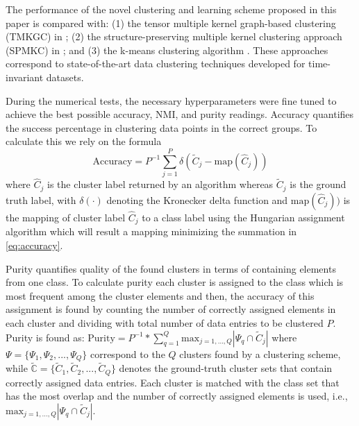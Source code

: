 \documentclass[10pt,final]{IEEEtran}
\begin{document}
The performance of the novel clustering and learning scheme proposed in this paper is compared with: (1) the tensor multiple kernel graph-based clustering (TMKGC) in \cite{tkmgc}; (2) the structure-preserving multiple kernel clustering approach (SPMKC) in \cite{SPMKC}; and (3) the  k-means clustering algorithm \cite{DCA}. These approaches correspond to state-of-the-art data clustering techniques developed for time-invariant datasets.

During the numerical tests, the necessary hyperparameters were fine tuned to achieve the best possible accuracy, NMI, and purity readings. 
Accuracy quantifies the  success percentage in clustering data points in the correct groups. To calculate this we rely on the formula
 \begin{equation}\label{eq:accuracy}
     \textrm{Accuracy}=P^{-1}\sum_{j=1}^P\delta (\tilde{C}_j-\textrm{map}(\hat{C}_j))
 \end{equation}
where $\hat{C}_j$ is the cluster label returned by an algorithm whereas $\tilde{C}_j$ is the ground truth label, with $\delta(\cdot)$ denoting the Kronecker delta function and $\textrm{map}(\hat{C}_j))$ is the mapping of cluster label $\hat{C}_j$ to a class label using the Hungarian assignment algorithm \cite{Hungarian} which will result a mapping minimizing the summation in \eqref{eq:accuracy}.
 
Purity quantifies quality of the found clusters in terms of containing elements from one class. To calculate purity each cluster is assigned to the class which is most frequent among the cluster elements and then, the accuracy of this assignment is found by counting the number of correctly assigned elements in each cluster and dividing with total number of data entries to be clustered $P$. Purity is found as:
 \newline
\begin{math}
\textrm{Purity}=P^{-1}*\sum_{q=1}^Q \textrm{max}_{j=1,\ldots,Q}|\Psi_q \cap \tilde{C}_j|
\end{math}
\newline
where \begin{math}\Psi=\{\Psi_1,\Psi_2,...,\Psi_Q\}\end{math} correspond to the $Q$ clusters found by a clustering scheme,  while \begin{math}\tilde{\mathbb{C}}=\{\tilde{C}_1,\tilde{C}_2,...,\tilde{C}_Q\}\end{math} denotes the ground-truth cluster sets that contain correctly assigned data entries. Each cluster is matched with the class set that has the most overlap and the number of correctly assigned elements is used, i.e., $\textrm{max}_{j=1,\ldots,Q}|\Psi_q \cap \tilde{C}_j|$.
\end{document}
